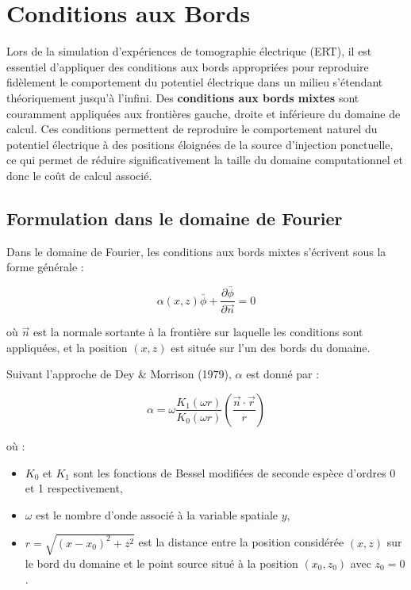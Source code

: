 \section{Conditions aux Bords}
\label{sec:boundary_conditions}

Lors de la simulation d'expériences de tomographie électrique (ERT), il est essentiel d'appliquer des conditions aux bords appropriées pour reproduire fidèlement le comportement du potentiel électrique dans un milieu s'étendant théoriquement jusqu'à l'infini. Des \textbf{conditions aux bords mixtes} sont couramment appliquées aux frontières gauche, droite et inférieure du domaine de calcul. Ces conditions permettent de reproduire le comportement naturel du potentiel électrique à des positions éloignées de la source d'injection ponctuelle, ce qui permet de réduire significativement la taille du domaine computationnel et donc le coût de calcul associé.

\subsection{Formulation dans le domaine de Fourier}

Dans le domaine de Fourier, les conditions aux bords mixtes s'écrivent sous la forme générale :

\begin{equation}
\alpha(x,z) \bar{\phi} + \frac{\partial \bar{\phi}}{\partial \vec{n}} = 0
\label{eq:mixed_bc}
\end{equation}

où $\vec{n}$ est la normale sortante à la frontière sur laquelle les conditions sont appliquées, et la position $(x,z)$ est située sur l'un des bords du domaine.

Suivant l'approche de Dey \& Morrison (1979), $\alpha$ est donné par :

\begin{equation}
\alpha = \omega \frac{K_1(\omega r)}{K_0(\omega r)} \left( \frac{\vec{n} \cdot \vec{r}}{r} \right)
\label{eq:alpha_coefficient}
\end{equation}

où :
\begin{itemize}[label = \textbullet]
    \item $K_0$ et $K_1$ sont les fonctions de Bessel modifiées de seconde espèce d'ordres 0 et 1 respectivement,
    \item $\omega$ est le nombre d'onde associé à la variable spatiale $y$,
    \item $r = \sqrt{(x-x_0)^2 + z^2}$ est la distance entre la position considérée $(x,z)$ sur le bord du domaine et le point source situé à la position $(x_0, z_0)$ avec $z_0 = 0$.
\end{itemize}

